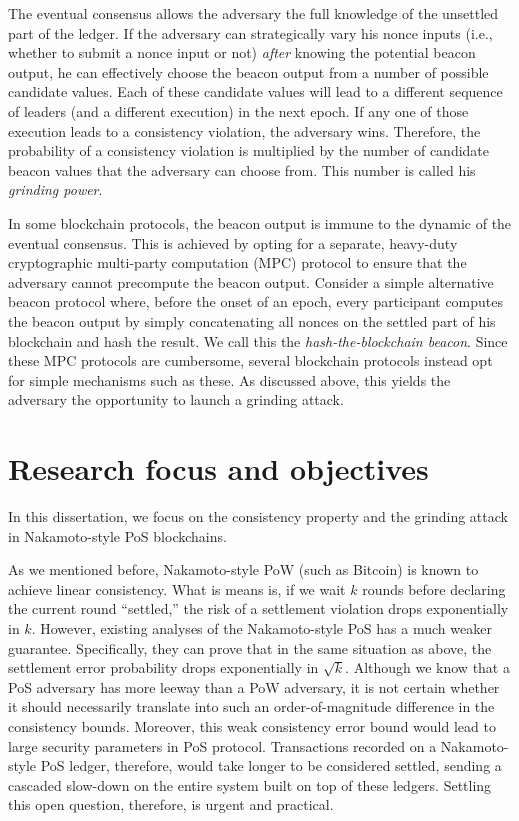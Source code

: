 The eventual consensus allows the adversary 
the full knowledge of the unsettled part of the ledger. 
If the adversary can strategically vary his nonce inputs 
(i.e., whether to submit a nonce input or not)
\emph{after} knowing the potential beacon output, 
he can effectively choose the beacon output from a number of possible candidate values. 
Each of these candidate values will lead to a different sequence of leaders 
(and a different execution) 
in the next epoch. 
If any one of those execution leads to a consistency violation, the adversary wins. 
Therefore, the probability of a consistency violation 
is multiplied by the number of candidate beacon values 
that the adversary can choose from. 
This number is called his \emph{grinding power}.

In some blockchain protocols, 
the beacon output is immune to the dynamic of the eventual consensus. 
This is achieved by opting for a separate, heavy-duty cryptographic multi-party computation (MPC) protocol 
to ensure that the adversary cannot precompute the beacon output.
Consider a simple alternative beacon protocol 
where, before the onset of an epoch, 
every participant computes the beacon output by simply 
concatenating all nonces on the settled part of his blockchain and hash the result. 
We call this the \emph{hash-the-blockchain beacon}.
Since these MPC protocols are cumbersome, 
several blockchain protocols instead opt for simple mechanisms such as these. 
As discussed above, this yields the adversary the opportunity to 
launch a grinding attack.



\section{Research focus and objectives}
In this dissertation, 
we focus on the consistency property and the grinding attack in Nakamoto-style PoS blockchains.

As we mentioned before, Nakamoto-style PoW (such as Bitcoin) 
is known to achieve linear consistency. 
What is means is, if we wait $k$ rounds before declaring the current round ``settled,'' 
the risk of a settlement violation drops exponentially in $k$. 
However, existing analyses of the Nakamoto-style PoS has a much weaker guarantee. 
Specifically, they can prove that in the same situation as above, 
the settlement error probability drops exponentially in $\sqrt{k}$. 
Although we know that a PoS adversary has more leeway than a PoW adversary, 
it is not certain whether it should necessarily translate into such 
an order-of-magnitude difference in the consistency bounds. 
Moreover, this weak consistency error bound would lead to large security parameters in PoS protocol. 
Transactions recorded on a Nakamoto-style PoS ledger, therefore, 
would take longer to be considered settled, 
sending a cascaded slow-down on the entire system built on top of these ledgers.
Settling this open question, therefore, is urgent and practical.


